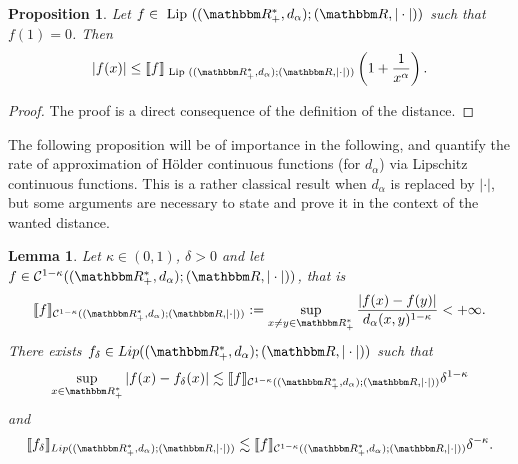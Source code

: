 \documentclass[a4paper,11pt, reqno]{amsart}
\newcommand{\cC}{\mathcal{C}}	\newcommand{\CC}{\mathbbm{C}}
\newcommand{\1}{\mathbbm{1}}
\theoremstyle{plain}
\newtheorem{lemma}[theorem]{Lemma}
\newtheorem{proposition}[theorem]{Proposition}
\theoremstyle{definition}
\begin{document}

\begin{proposition}
  Let $f \in  \text{ Lip } ((\RR_+^{\ast}, d_{\alpha}) ; (\RR, |
  \cdot |))$ such that $f (1) = 0$. Then
  \[ | f (x) | \le \llbracket f \rrbracket_{ \text{ Lip } ((\RR_+^{\ast}, d_{\alpha}) ; (\RR, | \cdot |))} \left( 1
     + \frac{1}{x^{\alpha}} \right) . \]
\end{proposition}

\begin{proof}
  The proof is a direct consequence of the definition of the distance.
\end{proof}

The following proposition will be of importance in the following, and quantify the rate of approximation of Hölder continuous functions (for $d_\alpha$) via Lipschitz continuous functions. This is a rather classical result when $d_\alpha$ is replaced by $|\cdot|$, but some arguments are necessary to state and prove it in the context of the wanted distance.

\begin{lemma}\label{lemma:holder-smooth-approx}
    Let $\kappa \in (0,1)$, $\delta>0$ and let $f\in \cC^{1-\kappa}((\RR_+^*,d_\alpha);(\RR,|\cdot|))$, that is 
    \[\llbracket f\rrbracket_{\cC^{1-\kappa}((\RR_+^*,d_\alpha);(\RR,|\cdot|))}:=\sup_{x\neq y \in \RR_+^*} \frac{|f(x)-f(y)|}{d_{\alpha}(x,y)^{1-\kappa}} < +\infty.\]
    There exists $f_\delta \in Lip((\RR_+^*,d_\alpha);(\RR,|\cdot|))$ such that 
    \[\sup_{x\in \RR_+^*} |f(x)-f_\delta(x)| \lesssim \llbracket f\rrbracket_{\cC^{1-\kappa}((\RR_+^*,d_\alpha);(\RR,|\cdot|))} \delta^{1-\kappa}\]
    and
    \[\llbracket f_\delta \rrbracket_{Lip((\RR_+^*,d_\alpha);(\RR,|\cdot|))} \lesssim \llbracket f\rrbracket_{\cC^{1-\kappa}((\RR_+^*,d_\alpha);(\RR,|\cdot|))} \delta^{-\kappa}.\]
\end{lemma}
\end{document}
